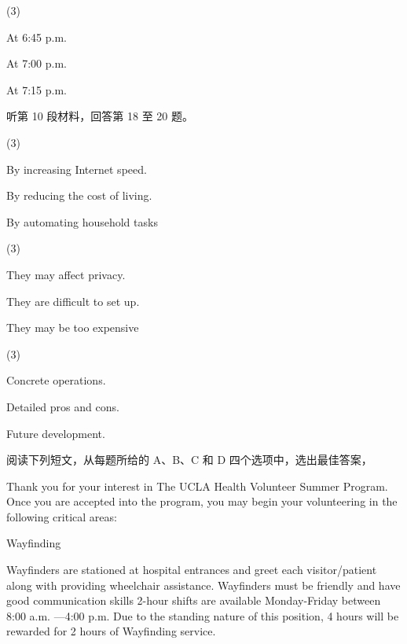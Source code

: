 \documentclass{英语试卷}
\begin{document}
\begin{choices}(3)
  \item At 6:45 p.m.
  \item At 7:00 p.m.
  \item At 7:15 p.m.
\end{choices}
\par 听第 10 段材料，回答第 18 至 20 题。\par
{}
\begin{choices}(3)
  \item By increasing Internet speed.
  \item By reducing the cost of living.
  \item By automating household tasks
\end{choices}
\begin{choices}(3)
  \item They may affect privacy.
  \item They are difficult to set up.
  \item They may be too expensive
\end{choices}
\begin{choices}(3)
  \item Concrete operations.
  \item Detailed pros and cons.
  \item Future development.
\end{choices}
\par 阅读下列短文，从每题所给的 A、B、C 和 D 四个选项中，选出最佳答案，\par
{}
\par Thank you for your interest in The UCLA Health Volunteer Summer Program. Once you are accepted into the program, you may begin your volunteering in the following critical areas:\par
\par Wayfinding\par
\par Wayfinders are stationed at hospital entrances and greet each visitor/patient along with providing wheelchair assistance. Wayfinders must be friendly and have good communication skills 2-hour shifts are available Monday-Friday between 8:00 a.m. —4:00 p.m. Due to the standing nature of this position, 4 hours will be rewarded for 2 hours of Wayfinding service.\par
\end{document}
